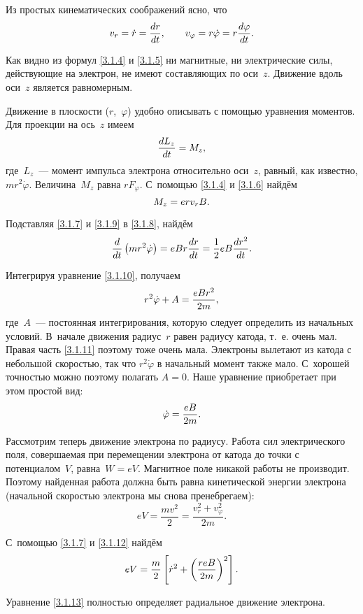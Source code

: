 Из простых кинематических соображений ясно, что
\begin{equation}
	v_r=\dot{r}=\frac{dr}{dt},\qquad
v_{\varphi}=r\dot{\varphi}=r\frac{d\varphi}{dt}.
	\eqmark{3.1.7}
\end{equation}

Как видно из формул \eqref{3.1.4} и \eqref{3.1.5} ни магнитные, ни электрические
силы, действующие на электрон, не имеют составляющих по оси~$z$. Движение вдоль
оси~$z$ является равномерным.

Движение в плоскости ($r$,~$\varphi$) удобно описывать с помощью уравнения
моментов. Для проекции на ось~$z$ имеем
\begin{equation}
	\frac{dL_{z}}{dt}=M_z,
	\eqmark{3.1.8}
\end{equation}
где~$L_{z}$~--- момент импульса электрона относительно оси~$z$, равный, как
известно, $mr^2\dot{\varphi}$. Величина~$M_z$ равна $rF_{\varphi}$. С~помощью
\eqref{3.1.4} и \eqref{3.1.6} найдём
\begin{equation}
	M_z=erv_rB.
	\eqmark{3.1.9}
\end{equation}

Подставляя \eqref{3.1.7} и \eqref{3.1.9} в \eqref{3.1.8}, найдём
\begin{equation}
\frac{d}{dt}\left(mr^2\dot{\varphi}\right)=eBr\frac{dr}{dt}=
\frac12eB\frac{dr^2}{dt}.
	\eqmark{3.1.10}
\end{equation}

Интегрируя уравнение \eqref{3.1.10}, получаем
\begin{equation}
	r^2\dot{\varphi}+A=\frac{eBr^2}{2m},
	\eqmark{3.1.11}
\end{equation}
где~$A$~--- постоянная интегрирования, которую следует определить из начальных
условий. В~начале движения радиус~$r$ равен радиусу катода, т.~е. очень мал.
Правая часть \eqref{3.1.11} поэтому тоже очень мала. Электроны вылетают из
катода с небольшой скоростью, так что $r^{2}\dot{\varphi}$ в начальный момент
также мало. С~хорошей точностью можно поэтому полагать $A=0$. Наше уравнение
приобретает при этом простой вид:
\begin{equation}
	\dot{\varphi}=\frac{eB}{2m}.
	\eqmark{3.1.12}
\end{equation}

Рассмотрим теперь движение электрона по радиусу. Работа сил электрического поля,
совершаемая при перемещении электрона от катода до точки с потенциалом~$V$,
равна~$W=eV$. Магнитное поле никакой работы не производит. Поэтому найденная
работа должна быть равна кинетической энергии электрона (начальной скоростью
электрона мы снова пренебрегаем):
\begin{equation*}
	eV=\frac{mv^2}{2}=\frac{v_r^2+v_\varphi^2}{2m}.
\end{equation*}

С~помощью \eqref{3.1.7} и \eqref{3.1.12} найдём
\begin{equation}
	eV=\frac{m}{2}\left[\dot{r}^2+\left(\frac{reB}{2m}\right)^2\right].
	\eqmark{3.1.13}
\end{equation}

Уравнение \eqref{3.1.13} полностью определяет радиальное движение электрона.



